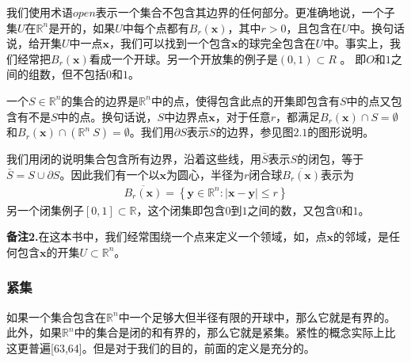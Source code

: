 \documentclass[12pt,a4paper]{article}
\numberwithin{equation}{section}
\begin{document}
我们使用术语$open$表示一个集合不包含其边界的任何部分。更准确地说，一个子集$U$在$\mathbb{R}^n$是开的，如果$U$中每个点都有$B_r(\mathbf{x})$，其中$r>0$，且包含在$U$中。换句话说，给开集$U$中一点$\mathbf{x}$，我们可以找到一个包含$\mathbf{x}$的球完全包含在$U$中。事实上，我们经常把$B_r(\mathbf{x})$看成一个开球。另一个开放集的例子是$(0,1)\subset R$ 。 即$O$和$1$之间的组数，但不包括$0$和$1$。

一个$S\in \mathbb{R}^n$的集合的边界是$\mathbb{R}^n$中的点，使得包含此点的开集即包含有$S$中的点又包含有不是$S$中的点。换句话说，$S$中边界点$\mathbf{x}$，对于任意$r$，都满足$B_r(\mathbf{x}) \cap S=\emptyset$和$B_r(\mathbf{x}) \cap (\mathbb{R}^n \ S)=\emptyset$。我们用$\partial S$表示$S$的边界，参见图$2.1$的图形说明。

我们用闭的说明集合包含所有边界，沿着这些线，用$\bar{S}$表示$S$的闭包，等于$\bar{S}=S \cup \partial S$。因此我们有一个以$\mathbf{x}$为圆心，半径为$r$闭合球$\overline{B_r(\mathbf{x})}$表示为
\begin{gather}
\overline{B_r(\mathbf{x})}=\left\{ \mathbf{y} \in \mathbb{R}^n:|\mathbf{x}- \mathbf{y}| \leq r \right\}
\end{gather}
另一个闭集例子$[0,1]\subset \mathbb{R}$，这个闭集即包含$0$到$1$之间的数，又包含$0$和$1$。

\textbf{备注2.}在这本书中，我们经常围绕一个点来定义一个领域，如，点$\mathbf{x}$的邻域，是任何包含$\mathbf{x}$的开集$U \subset \mathbb{R}^n$。

\subsubsection{紧集}
如果一个集合包含在$\mathbb{R}^n$中一个足够大但半径有限的开球中，那么它就是有界的。此外，如果$\mathbb{R}^n$中的集合是闭的和有界的，那么它就是紧集。紧性的概念实际上比这更普遍[63,64]。但是对于我们的目的，前面的定义是充分的。
\end{document}
